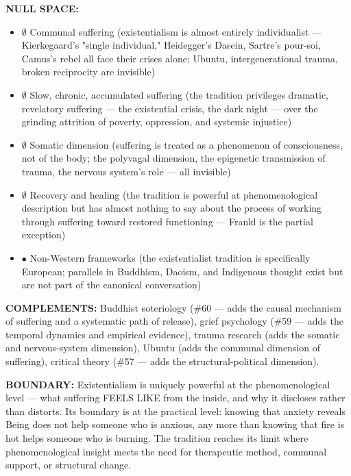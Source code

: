 \textbf{NULL SPACE:}

\begin{itemize}[nosep,leftmargin=*]
  \item $\emptyset$ Communal suffering (existentialism is almost entirely individualist — Kierkegaard's "single individual," Heidegger's Dasein, Sartre's pour-soi, Camus's rebel all face their crises alone; Ubuntu, intergenerational trauma, broken reciprocity are invisible)
  \item $\emptyset$ Slow, chronic, accumulated suffering (the tradition privileges dramatic, revelatory suffering — the existential crisis, the dark night — over the grinding attrition of poverty, oppression, and systemic injustice)
  \item $\emptyset$ Somatic dimension (suffering is treated as a phenomenon of consciousness, not of the body; the polyvagal dimension, the epigenetic transmission of trauma, the nervous system's role — all invisible)
  \item $\emptyset$ Recovery and healing (the tradition is powerful at phenomenological description but has almost nothing to say about the process of working through suffering toward restored functioning — Frankl is the partial exception)
  \item $\bullet$ Non-Western frameworks (the existentialist tradition is specifically European; parallels in Buddhism, Daoism, and Indigenous thought exist but are not part of the canonical conversation)
\end{itemize}


\textbf{COMPLEMENTS:} Buddhist soteriology (\#60 — adds the causal mechanism of suffering and a systematic path of release), grief psychology (\#59 — adds the temporal dynamics and empirical evidence), trauma research (adds the somatic and nervous-system dimension), Ubuntu (adds the communal dimension of suffering), critical theory (\#57 — adds the structural-political dimension).


\textbf{BOUNDARY:} Existentialism is uniquely powerful at the phenomenological level — what suffering FEELS LIKE from the inside, and why it discloses rather than distorts. Its boundary is at the practical level: knowing that anxiety reveals Being does not help someone who is anxious, any more than knowing that fire is hot helps someone who is burning. The tradition reaches its limit where phenomenological insight meets the need for therapeutic method, communal support, or structural change.



